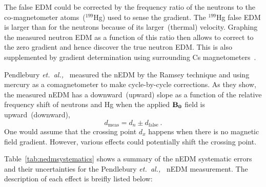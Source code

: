 The false EDM could be corrected by the frequency ratio of the
neutrons to the co-magnetometer atoms~($^{199}$Hg) used to sense the
gradient. The $^{199}$Hg false EDM is larger than for the neutrons
because of its larger~(thermal) velocity.  Graphing the measured
neutron EDM as a function of this ratio then allows to correct to the
zero gradient and hence discover the true neutron EDM. This is also
supplemented by gradient determination using surrounding Cs
magnetometers~\cite{afach2015measurement}.


Pendlebury {\it{et.~al.,}}~\cite{Pendlebury2015} measured the nEDM by
the Ramsey technique and using mercury as a comagnetometer to make
cycle-by-cycle corrections.  As they show, the measured nEDM has a
downward~(upward) slope as a function of the relative frequency shift
of neutrons and Hg when the applied $\bf{B_0}$ field is
upward~(downward),
\begin{equation}
  d_{\mathrm {meas}}= d_n \pm d_{\mathrm{false}}~.
\end{equation}
One would assume that the crossing point $d_x$ happens when there is
no magnetic field gradient. However, various effects could potentially
shift the crossing point.


Table~\ref{tab:nedmsystematics} shows a summary of the nEDM systematic
errors and their uncertainties for the Pendlebury
{\it{et.~al.,}}~\cite{Pendlebury2015} nEDM measurement. The
description of each effect is breifly listed below:

